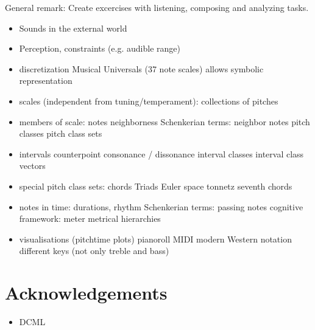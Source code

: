 \documentclass[letterpaper,10pt,english]{sphinxmanual}
\begin{document}
General remark: Create excercises with listening, composing and analyzing tasks.
\begin{itemize}
\item {} 
Sounds in the external world

\item {} 
Perception, constraints (e.g. audible range)

\item {} 
discretization
\sphinxhyphen{} Musical Universals (3\sphinxhyphen{}7 note scales)
\sphinxhyphen{} allows symbolic representation

\item {} 
scales (independent from tuning/temperament): collections of pitches

\item {} 
members of scale: notes
\sphinxhyphen{} neighborness
\sphinxhyphen{} Schenkerian terms: neighbor notes
\sphinxhyphen{} pitch classes
\sphinxhyphen{} pitch class sets

\item {} 
intervals
\sphinxhyphen{} counterpoint
\sphinxhyphen{} consonance / dissonance
\sphinxhyphen{} interval classes
\sphinxhyphen{} interval class vectors

\item {} 
special pitch class sets: chords
\sphinxhyphen{} Triads
\sphinxhyphen{} Euler space
\sphinxhyphen{} tonnetz
\sphinxhyphen{} seventh chords

\item {} 
notes in time: durations, rhythm
\sphinxhyphen{} Schenkerian terms: passing notes
\sphinxhyphen{} cognitive framework: meter
\sphinxhyphen{} metrical hierarchies

\item {} 
visualisations (pitch\sphinxhyphen{}time plots)
\sphinxhyphen{} pianoroll
\sphinxhyphen{} MIDI
\sphinxhyphen{} modern Western notation
\sphinxhyphen{} different keys (not only treble and bass)

\end{itemize}


\section{Acknowledgements}
\label{\detokenize{0_intro:acknowledgements}}\begin{itemize}
\item {} 
DCML

\end{itemize}
\end{document}
